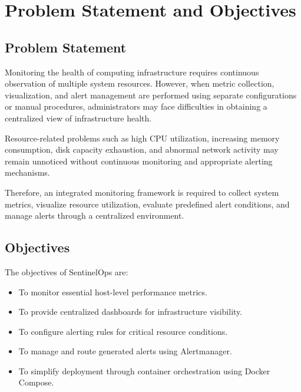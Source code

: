 \documentclass[conference]{IEEEtran}
\begin{document}

\section{Problem Statement and Objectives}

\subsection{Problem Statement}

Monitoring the health of computing infrastructure requires
continuous observation of multiple system resources. However,
when metric collection, visualization, and alert management are
performed using separate configurations or manual procedures,
administrators may face difficulties in obtaining a centralized
view of infrastructure health.

Resource-related problems such as high CPU utilization,
increasing memory consumption, disk capacity exhaustion, and
abnormal network activity may remain unnoticed without
continuous monitoring and appropriate alerting mechanisms.

Therefore, an integrated monitoring framework is required to
collect system metrics, visualize resource utilization, evaluate
predefined alert conditions, and manage alerts through a
centralized environment.

\subsection{Objectives}

The objectives of SentinelOps are:

\begin{itemize}
    \item To monitor essential host-level performance metrics.
    \item To provide centralized dashboards for infrastructure
    visibility.
    \item To configure alerting rules for critical resource
    conditions.
    \item To manage and route generated alerts using Alertmanager.
    \item To simplify deployment through container orchestration
    using Docker Compose.
\end{itemize}

\end{document}
